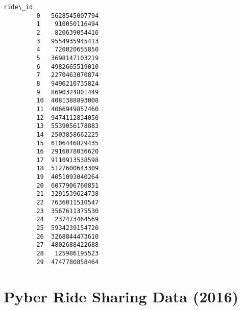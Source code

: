 \documentclass[11pt]{article}
\begin{document}
\begin{Verbatim}[commandchars=\\\{\}]
                   ride\_id  
         0   5628545007794  
         1    910050116494  
         2    820639054416  
         3   9554935945413  
         4    720020655850  
         5   3698147103219  
         6   4982665519010  
         7   2270463070874  
         8   9496210735824  
         9   8690324801449  
         10  4081388893008  
         11  4066949857460  
         12  9474112834050  
         13  5539056178883  
         14  2503858662225  
         15  6106446829435  
         16  2916078036620  
         17  9110913538598  
         18  5127600643309  
         19  4051093040264  
         20  6077906760851  
         21  3291539624738  
         22  7636011510547  
         23  3567611375530  
         24   237473464569  
         25  5934239154720  
         26  3268844473610  
         27  4802688422688  
         28   125986195523  
         29  4747780858464  
\end{Verbatim}
            
    \section{Pyber Ride Sharing Data
(2016)}\label{pyber-ride-sharing-data-2016}
\end{document}
